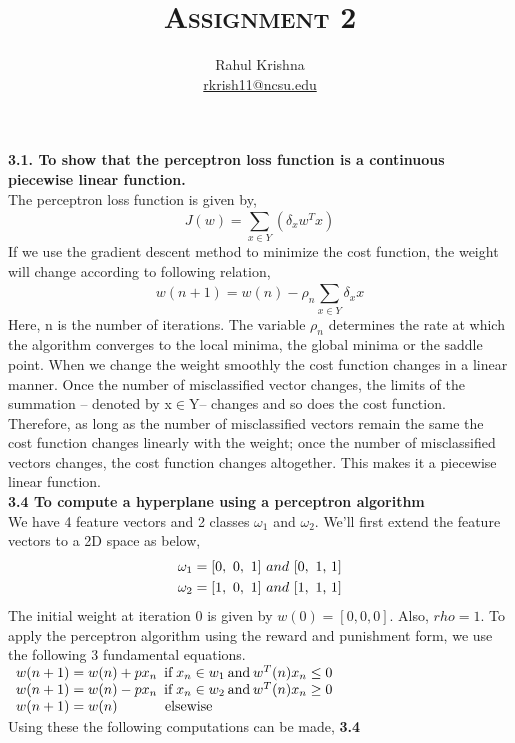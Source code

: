 \documentclass[10pt, letter]{article} %
\title{\textsc{Assignment 2}}
\author{Rahul Krishna\\{\color{blue} \href{mailto:rkrish11@ncsu.edu}{rkrish11@ncsu.edu}}}
\begin{document}
\maketitle
\noindent\textbf{3.1. To show that the perceptron loss function is a continuous piecewise linear function.}\\[0.2cm]
The perceptron loss function is given by,\\
\begin{equation}
J(w) = \sum\limits_{x \in Y}^{} {({\delta _x}{w^T}x)}
\end{equation}
If we use the gradient descent method to minimize the cost function, the weight will change according to following relation,
\begin{equation}
w(n + 1) = w(n) - {\rho _n}\sum\limits_{x \in Y}^{} {{\delta _x}x}
\end{equation}
Here, n is the number of iterations. The variable $\rho_n$ determines the rate at which the algorithm converges to the local minima, the global minima or the saddle point. When we change the weight smoothly the cost function changes in a linear manner. Once the number of misclassified vector changes, the limits of the summation -- denoted by x$\in$Y-- changes and so does the cost function. Therefore, as long as the number of misclassified vectors remain the same the cost function changes linearly with the weight; once the number of misclassified vectors changes, the cost function changes altogether. This makes it a piecewise linear function.\\[0.625cm]
\noindent\textbf{3.4 To compute a hyperplane using a perceptron algorithm}\\[0.25cm]
We have 4 feature vectors and 2 classes $\omega_1$ and $\omega_2$. We'll first extend the feature vectors to a 2D space as below,
\[\begin{gathered}
  {\omega _1} = [0,{\text{ }}0,{\text{ }}1]{\text{ }}and{\text{ }}[0,{\text{ 1, 1}}] \hfill \\
  {\omega _2} = [1,{\text{ }}0,{\text{ }}1]{\text{ }}and{\text{ }}[1,{\text{ 1, 1}}] \hfill \\
\end{gathered} \]
The initial weight at iteration 0 is given by $w(0)=[0, 0, 0]$. Also, $rho=1$.  To apply the perceptron algorithm using the reward and punishment form, we use the following 3 fundamental equations.\\[0.2cm]
$\begin{array}{l}
w(n + 1) = w(n) + p{\rm{ }}{x_n}{\hspace{5pt}\rm{if }}\hspace{2pt}{x_n}\in {w_1}{\hspace{2pt}\rm{and }}\hspace{2pt}{w^T}(n){x_n} \le 0\\
w(n + 1) = w(n) - p{\rm{ }}{x_n}{\hspace{5pt}\rm{if }}\hspace{2pt}{x_n}\in {w_2}{\hspace{2pt}\rm{and }}\hspace{2pt}{w^T}(n){x_n} \ge 0\\
w(n + 1) = w(n){\hspace{34pt}\rm{elsewise}}
\end{array}$\\[0.2cm]
Using these the following computations can be made,
\pagebreak
\noindent\textbf{3.4  }\\[0.25cm]
\end{document}
